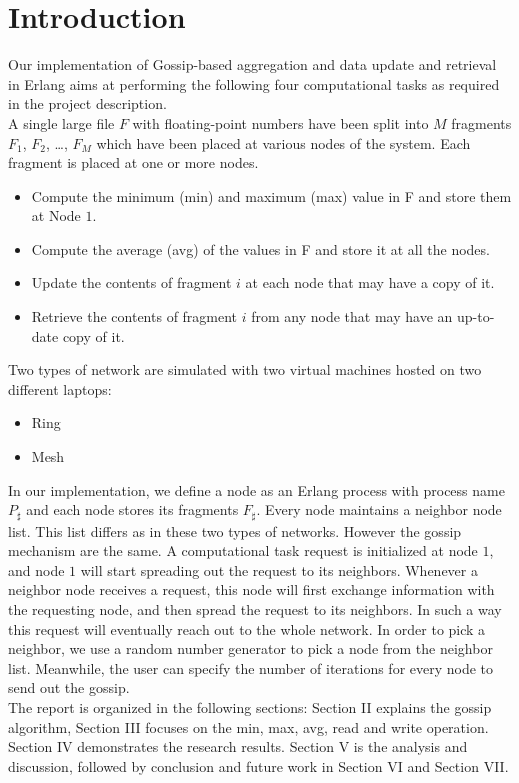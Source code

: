 \documentclass[12pt, conference, compsocconf]{IEEEtran}
\begin{document}
%
\IEEEpeerreviewmaketitle



\section{Introduction}
\indent Our implementation of Gossip-based aggregation and data update and retrieval in Erlang aims at performing the following four computational tasks as required in the project description. \\
\indent A single large file $F$ with floating-point numbers have been split into $M$ fragments $F_1$, $F_2$, …, $F_M$ which have been placed at various nodes of the system. Each fragment is placed at one or more nodes.
\begin{itemize}
	\item Compute the minimum (min) and maximum (max) value in F and store them at Node $1$.
	\item Compute the average (avg) of the values in F and store it at all the nodes.
	\item Update the contents of fragment $i$ at each node that may have a copy of it. 
	\item Retrieve the contents of fragment $i$ from any node that may have an up-to-date copy of it. 
\end{itemize}
\indent Two types of network are simulated with two virtual machines hosted on two different laptops:
\begin{itemize}
	\item Ring 
	\item Mesh
\end{itemize}
\indent In our implementation, we define a node as an Erlang process with process name $P_\sharp$ and each node stores its fragments $F_\sharp$.  Every node maintains a neighbor node list. This list differs as in these two types of networks. However the gossip mechanism are the same. A computational task request is initialized at node $1$, and node $1$ will start spreading out the request to its neighbors. Whenever a neighbor node receives a request, this node will first exchange information with the requesting node, and then spread the request to its neighbors.  In such a way this request will eventually reach out to the whole network. In order to pick a neighbor, we use a random number generator to pick a node from the neighbor list. Meanwhile, the user can specify the number of iterations for every node to send out the gossip. \\
\indent The report is organized in the following sections: Section II explains the gossip algorithm, Section III focuses on the min, max, avg, read and write operation. Section IV demonstrates the research results. Section V is the analysis and discussion, followed by conclusion and future work in Section VI and Section VII.  
\end{document}
